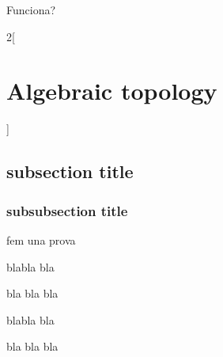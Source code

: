 \documentclass[../../../main.tex]{subfiles}
\begin{document}
\renewcommand{\col}{\geo}
Funciona?
\begin{multicols}{2}[\section{Algebraic topology}]
  \subsection{subsection title}
  \subsubsection{subsubsection title}
  \begin{definition}
    fem una prova
  \end{definition}
  \begin{theorem}
    blabla bla
  \end{theorem}
  \begin{lemma}
    bla bla bla
  \end{lemma}
  \begin{proposition}
    blabla bla
  \end{proposition}
  \begin{corollary}
    bla bla bla
  \end{corollary}
\end{multicols}
\end{document}

